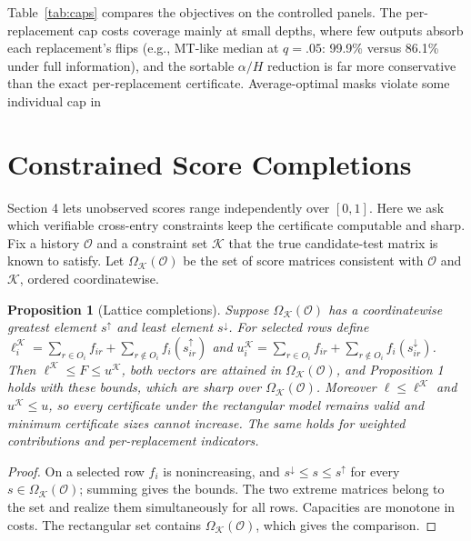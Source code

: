 \documentclass[11pt]{article}
\newtheorem{proposition}{Proposition}
\begin{document}
Table~\ref{tab:caps} compares the objectives on the controlled panels. The per-replacement cap costs coverage mainly at small depths, where few outputs absorb each replacement's flips (e.g., MT-like median at $q=.05$: 99.9\% versus 86.1\% under full information), and the sortable $\alpha/H$ reduction is far more conservative than the exact per-replacement certificate. Average-optimal masks violate some individual cap in %

\section{Constrained Score Completions}
\label{app:lattice}
Section 4 lets unobserved scores range independently over $[0,1]$. Here we ask which verifiable cross-entry constraints keep the certificate computable and sharp. Fix a history $\mathcal O$ and a constraint set $\mathcal K$ that the true candidate-test matrix is known to satisfy. Let $\Omega_{\mathcal K}(\mathcal O)$ be the set of score matrices consistent with $\mathcal O$ and $\mathcal K$, ordered coordinatewise.

\begin{proposition}[Lattice completions]
\label{prop:lattice}
Suppose $\Omega_{\mathcal K}(\mathcal O)$ has a coordinatewise greatest element $s^\uparrow$ and least element $s^\downarrow$. For selected rows define $\ell_i^{\mathcal K}=\sum_{r\in O_i}f_{ir}+\sum_{r\notin O_i}f_i(s^\uparrow_{ir})$ and $u_i^{\mathcal K}=\sum_{r\in O_i}f_{ir}+\sum_{r\notin O_i}f_i(s^\downarrow_{ir})$. Then $\ell^{\mathcal K}\le F\le u^{\mathcal K}$, both vectors are attained in $\Omega_{\mathcal K}(\mathcal O)$, and Proposition 1 holds with these bounds, which are sharp over $\Omega_{\mathcal K}(\mathcal O)$. Moreover $\ell\le\ell^{\mathcal K}$ and $u^{\mathcal K}\le u$, so every certificate under the rectangular model remains valid and minimum certificate sizes cannot increase. The same holds for weighted contributions and per-replacement indicators.
\end{proposition}
\begin{proof}
On a selected row $f_i$ is nonincreasing, and $s^\downarrow\le s\le s^\uparrow$ for every $s\in\Omega_{\mathcal K}(\mathcal O)$; summing gives the bounds. The two extreme matrices belong to the set and realize them simultaneously for all rows. Capacities are monotone in costs. The rectangular set contains $\Omega_{\mathcal K}(\mathcal O)$, which gives the comparison.
\end{proof}
\end{document}

